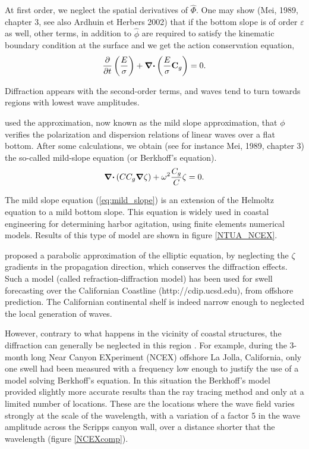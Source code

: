 At first order, we neglect the spatial derivatives of  $\hat{\Phi}$.
One may show (Mei, 1989, chapter 3, see also Ardhuin et Herbers 2002\nocite{Ardhuin&Herbers2002})
that if the bottom slope is of order  $\varepsilon$ as well, other terms, in
addition to $\hat{\phi}$ are required to satisfy the kinematic boundary condition
at the surface and we get the action conservation equation,
\begin{equation}
    \frac{\partial}{\partial t} \left( \frac{E}{\sigma} \right)
    +\mbox{\boldmath $\nabla$} \mbox{\boldmath $\cdot$} \left( \frac{E}{\sigma} {\mathbf C}_g \right)=0.
\end{equation}

Diffraction appears with the second-order terms, and waves tend 
to turn towards regions with lowest wave amplitudes.

\cite{Berkhoff1972} used the approximation, now known as the mild slope approximation, 
that $\phi$  verifies the polarization and dispersion
relations of linear waves over a flat bottom. After some calculations, we obtain (see for instance Mei, 1989, chapter 3)
the so-called mild-slope equation (or Berkhoff's equation).
\begin{equation}
    \mbox{\boldmath $\nabla$} \mbox{\boldmath $\cdot$} \left( C C_g \mbox{\boldmath $\nabla$} \zeta\right) +\omega^2\frac{C_g}{C}\zeta=0.\label{eq:mild_slope}
\end{equation}

The mild slope equation (\ref{eq:mild_slope}) is an extension of the Helmoltz equation to a mild bottom slope. This equation 
is widely used in coastal engineering for determining harbor agitation, using
finite elements numerical models. Results of this type of model are shown in figure \ref{NTUA_NCEX}.

\cite{Radder1979} proposed a parabolic approximation
of the elliptic equation, by neglecting the $\zeta$ gradients in the
propagation direction, which conserves the diffraction effects. Such a
model (called refraction-diffraction model) has been used for swell forecasting
over the Californian Coastline (http://cdip.ucsd.edu), from offshore
prediction. The Californian continental shelf is indeed narrow enough to neglected
the local generation of waves.

However, contrary to what happens in the vicinity of coastal structures, 
the diffraction can generally be neglected in this region \cite{OReilly&Guza1991,Peak2004}. For example, during the
3-month long Near Canyon EXperiment (NCEX) offshore La Jolla, California, 
only one swell had been measured with a frequency low enough
to justify the use of a model solving Berkhoff's equation. In this situation the
Berkhoff's model provided slightly more accurate results than the ray tracing
method and only at a limited number of locations. These are the locations 
where the wave field varies strongly at the scale of the wavelength, with a variation
of a factor 5 in the wave amplitude across the Scripps canyon wall, over a distance shorter that the wavelength
(figure \ref{NCEXcomp}).


